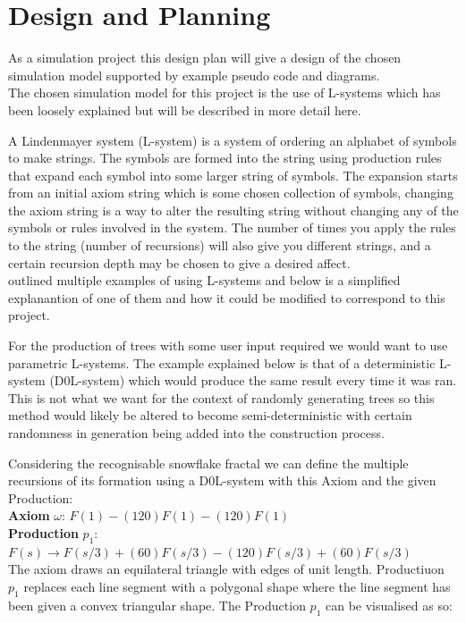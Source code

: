 \documentclass[progress]{cmpreport}
\begin{document}
\section{Design and Planning}
As a simulation project this design plan will give a design of the chosen simulation model 
supported by example pseudo code and diagrams.\\

The chosen simulation model for this project is the use of L-systems which has been loosely 
explained but will be described in more detail here.

A Lindenmayer system (L-system) is a system of ordering an alphabet of symbols to make 
strings. The symbols are formed into the string using production rules that expand each 
symbol into some larger string of symbols. The expansion starts from an initial axiom string 
which is some chosen collection of symbols, changing the axiom string is a way to alter the 
resulting string without changing any of the symbols or rules involved in the system. The 
number of times you apply the rules to the string (number of recursions) will also give you 
different strings, and a certain recursion depth may be chosen to give a desired affect.\\

\cite{prusinkiewicz1996systems} outlined multiple examples of using L-systems and below is 
a simplified explanantion of one of them and how it could be modified to correspond to this 
project.

For the production of trees with some user input required we would want to use parametric 
L-systems. The example explained below is that of a deterministic L-system (D0L-system) which 
would produce the same result every time it was ran. This is not what we want for the context 
of randomly generating trees so this method would likely be altered to become semi-deterministic 
with certain randomness in generation being added into the construction process. 

Considering the recognisable snowflake fractal we can define the multiple recursions of its 
formation using a D0L-system with this Axiom and the given Production: \\

\textbf{Axiom} $\omega$: $F(1) - (120)F(1) - (120)F(1)$ \\
\indent \textbf{Production} $p_1$: $F(s) \rightarrow F(s/3) + (60)F(s/3) - (120)F(s/3) + (60)F(s/3)$ \\

The axiom draws an equilateral triangle with edges of unit length. Productiuon $p_1$ replaces 
each line segment with a polygonal shape where the line segment has been given a convex 
triangular shape. The Production $p_1$ can be visualised as so:
\end{document}
